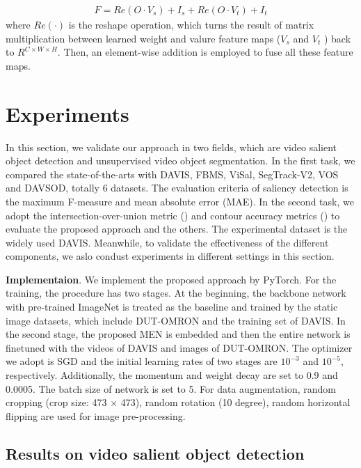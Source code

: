 \documentclass[12pt]{article}
\begin{document}
\begin{equation}
\label{sta}
\begin{aligned}
   F = Re(O \cdot V_s)+ I_s + Re(O \cdot V_t)+ I_t 
 \end{aligned}
\end{equation} where $Re(\cdot)$ is the reshape operation, which turns the result of matrix multiplication between learned weight and valure feature maps ($V_s$ and $V_t$ ) back to $R^{C \times W \times H}$. Then, an element-wise addition is employed to fuse all these feature maps.

\section{Experiments} 

In this section, we validate our approach in two fields, which are video salient object detection and unsupervised video object segmentation. In the first task, we compared the state-of-the-arts with DAVIS, FBMS, ViSal, SegTrack-V2, VOS and DAVSOD, totally 6 datasets. The evaluation criteria of saliency detection is the maximum F-measure and mean absolute error (MAE). In the second task, we adopt the intersection-over-union metric () and contour accuracy metrics () to evaluate the proposed approach and the others. The experimental dataset is the widely used DAVIS. Meanwhile, to validate the effectiveness of the different components, we aslo condust experiments in different settings in this section.

\textbf{Implementaion}. We implement the proposed approach by PyTorch. For the training, the procedure has two stages. At the beginning, the backbone network with pre-trained ImageNet is treated as the baseline and trained by the static image datasets, which include DUT-OMRON and the training set of DAVIS. In the second stage, the proposed MEN is embedded and then the entire network is finetuned with the videos of DAVIS and images of DUT-OMRON. The optimizer we adopt is SGD and the initial learning rates of two stages are $10^{-3}$ and $10^{-5}$, respectively. Additionally, the momentum and weight decay are set to 0.9 and 0.0005. The batch size of network is set to 5. For data augmentation, random cropping (crop size: 473 $\times$ 473), random rotation (10 degree), random horizontal flipping are used for image pre-processing.

\subsection{Results on video salient object detection}
\end{document}
